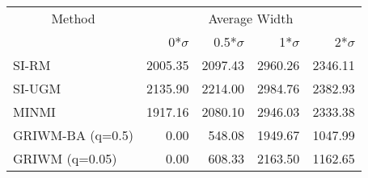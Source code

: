 
\begin{tabular}{lrrrr}
\toprule
\multicolumn{1}{c}{Method} & \multicolumn{4}{c}{Average Width} \\
 & 0*$\sigma$ & 0.5*$\sigma$ & 1*$\sigma$ & 2*$\sigma$\\
\midrule
SI-RM & 2005.35 & 2097.43 & 2960.26 & 2346.11\\
SI-UGM & 2135.90 & 2214.00 & 2984.76 & 2382.93\\
MINMI & 1917.16 & 2080.10 & 2946.03 & 2333.38\\
GRIWM-BA (q=0.5) & 0.00 & 548.08 & 1949.67 & 1047.99\\
GRIWM (q=0.05) & 0.00 & 608.33 & 2163.50 & 1162.65\\
\bottomrule
\end{tabular}
